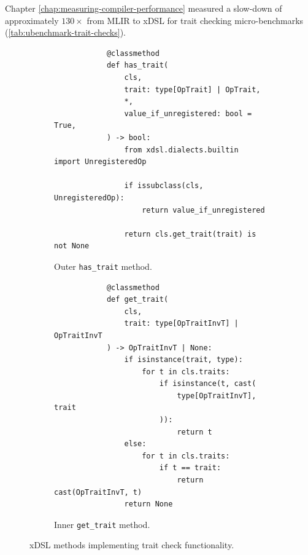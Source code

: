 Chapter \ref{chap:measuring-compiler-performance} measured a slow-down of approximately $130\times$ from MLIR to xDSL for trait checking micro-benchmarks (\autoref{tab:ubenchmark-trait-checks}).

\begin{figure}[H]
    \begin{subfigure}[b]{0.45\textwidth}
       \centering
        \begin{verbatim}
            @classmethod
            def has_trait(
                cls,
                trait: type[OpTrait] | OpTrait,
                *,
                value_if_unregistered: bool = True,
            ) -> bool:
                from xdsl.dialects.builtin import UnregisteredOp
        
                if issubclass(cls, UnregisteredOp):
                    return value_if_unregistered
        
                return cls.get_trait(trait) is not None
        \end{verbatim}
        \footnotesize\vspace{1.5em}
        \caption{Outer \texttt{has_trait} method.}
        \label{listing:ubenchmark-trait-checks-xdsl-has}
    \end{subfigure}
    \hfill
    \begin{subfigure}[b]{0.45\textwidth}
        \centering
        \begin{verbatim}
            @classmethod
            def get_trait(
                cls,
                trait: type[OpTraitInvT] | OpTraitInvT
            ) -> OpTraitInvT | None:
                if isinstance(trait, type):
                    for t in cls.traits:
                        if isinstance(t, cast(
                            type[OpTraitInvT], trait
                        )):
                            return t
                else:
                    for t in cls.traits:
                        if t == trait:
                            return cast(OpTraitInvT, t)
                return None
        \end{verbatim}
        \caption{Inner \texttt{get_trait} method.}
        \label{listing:ubenchmark-trait-checks-xdsl-get}
    \end{subfigure}
    \vspace{1em}
    \captionsetup{name=Listing}
    \caption{xDSL methods implementing trait check functionality.}
    \label{listing:ubenchmark-trait-checks-xdsl}
\end{figure}

